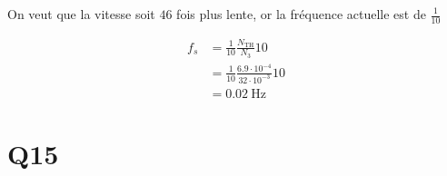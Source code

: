 \documentclass{article}
\begin{document}
On veut que la vitesse soit $46$ fois plus lente, or la fréquence actuelle est de $\frac{1}{10}$

\begin{equation*}
  \begin{split}
    f_s &= \frac{1}{10} \frac{N_\text{TH}}{N_3}10 \\
        &= \frac{1}{10} \frac{6.9\cdot10^{-4}}{32\cdot10^{-3}}10 \\
        &= \SI{0.02}{\hertz}
  \end{split}
\end{equation*}


\section{Q15}
\end{document}
